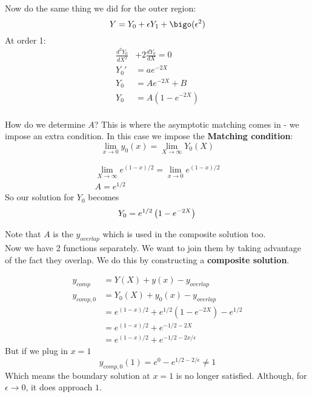 \documentclass{X:/Documents/Coding/Latex/myassignment}
\begin{document}
Now do the same thing we did for the outer region:
\[Y = Y_0 + \epsilon Y_1 + \bigo(\epsilon^2)\]
At order 1:
\begin{align*}
    \frac{d^2Y_0}{dX^2}& + 2 \frac{dY_0}{dX} =0\\
    Y_0' &= ae^{-2X}\\
    Y_0 &= Ae^{-2X} + B\\
    Y_0 &= A\left(1- e^{-2X} \right)\\
\end{align*}

How do we determine $A$? This is where the asymptotic matching comes in - we impose an extra condition. In this case we impose the \textbf{Matching condition}:
\[\lim_{x\to 0} y_0(x) = \lim_{X\to \infty} Y_0(X) \]

\begin{align*}
    \lim_{X\to \infty} e^{(1-x)/2} = \lim_{x \to 0} e^{(1-x)/2}\\
    A = e^{1/2} 
\end{align*}
So our solution for $Y_0$ becomes
\[Y_0 = e^{1/2}\left(1- e^{-2X} \right)\\\]

Note that $A$ is the $y_{overlap}$ which is used in the composite solution too.\\
Now we have 2 functions separately. We want to join them by taking advantage of the fact they overlap. We do this by constructing a \textbf{composite solution}.

\begin{align*}
    y_{comp} &= Y(X) + y(x) - y_{overlap}\\
    y_{comp,0} &= Y_0(X) + y_0(x) - y_{overlap}\\
    &=e^{(1-x)/2} + e^{1/2}\left(1-e^{-2X}\right) - e^{1/2}\\
    &=e^{(1-x)/2} + e^{-1/2 - 2X}\\
    &=e^{(1-x)/2} + e^{-1/2 - 2x/\epsilon}
\end{align*}
But if we plug in $x=1$
\[y_{comp,0}(1) = e^{0} - e^{1/2 -2/\epsilon} \neq 1 \]
Which means the boundary solution at $x=1$ is no longer satisfied. Although, for $\epsilon \to 0$, it does approach $1$.
\end{document}

